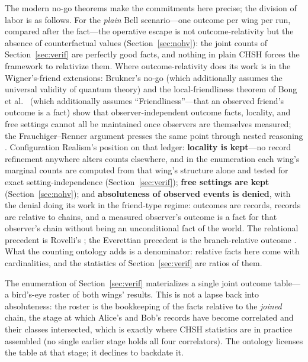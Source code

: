 \documentclass[11pt]{article}
\theoremstyle{definition}
\theoremstyle{remark}
\begin{document}
The modern no-go theorems make the commitments here precise; the division of labor is as follows. For the \emph{plain} Bell scenario---one outcome per wing per run, compared after the fact---the operative escape is not outcome-relativity but the absence of counterfactual values (Section~\ref{sec:nohv}): the joint counts of Section~\ref{sec:verif} are perfectly good facts, and nothing in plain CHSH forces the framework to relativize them. Where outcome-relativity does its work is in the Wigner's-friend extensions: Brukner's no-go \cite{Brukner2018} (which additionally assumes the universal validity of quantum theory) and the local-friendliness theorem of Bong et al.\ \cite{Bong2020} (which additionally assumes ``Friendliness''---that an observed friend's outcome is a fact) show that observer-independent outcome facts, locality, and free settings cannot all be maintained once observers are themselves measured; the Frauchiger--Renner argument presses the same point through nested reasoning \cite{FrauchigerRenner2018}. Configuration Realism's position on that ledger: \textbf{locality is kept}---no record refinement anywhere alters counts elsewhere, and in the enumeration each wing's marginal counts are computed from that wing's structure alone and tested for exact setting-independence (Section~\ref{sec:verif}); \textbf{free settings are kept} (Section~\ref{sec:nohv}); and \textbf{absoluteness of observed events is denied}, with the denial doing its work in the friend-type regime: outcomes are records, records are relative to chains, and a measured observer's outcome is a fact for that observer's chain without being an unconditional fact of the world. The relational precedent is Rovelli's \cite{Rovelli1996,DiBiagio2021}; the Everettian precedent is the branch-relative outcome \cite{Wallace2012}. What the counting ontology adds is a denominator: relative facts here come with cardinalities, and the statistics of Section~\ref{sec:verif} are ratios of them.

The enumeration of Section~\ref{sec:verif} materializes a single joint outcome table---a bird's-eye roster of both wings' results. This is not a lapse back into absoluteness: the roster is the bookkeeping of the facts relative to the \emph{joined} chain, the stage at which Alice's and Bob's records have become correlated and their classes intersected, which is exactly where CHSH statistics are in practice assembled (no single earlier stage holds all four correlators). The ontology licenses the table at that stage; it declines to backdate it.
\end{document}
